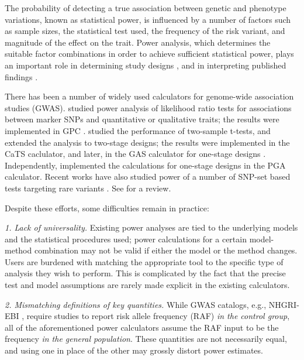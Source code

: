 The probability of detecting a true association between genetic and phenotype variations, known as statistical power, is influenced by a number of factors such as sample sizes, the statistical test used, the frequency of the risk variant, and magnitude of the effect on the trait. 
Power analysis, which determines the suitable factor combinations in order to achieve sufficient statistical power, plays an important role in determining study designs \citep{Skol06, Goodwin16}, and in interpreting published findings \citep{Ioannidis05}.

There has been a number of widely used calculators for genome-wide association studies (GWAS). 
\cite{Sham98} studied power analysis of likelihood ratio tests for associations between marker SNPs and quantitative or qualitative traits; the results were implemented in GPC \citep{Purcell03}.
\cite{Skol06} studied the performance of two-sample t-tests, and extended the analysis to two-stage designs; the results were implemented in the CaTS caclulator, and later, in the GAS calculator for one-stage designs \citep{Johnson17}.
Independently, \citet{Menashe08} implemented the calculations for one-stage designs in the PGA calculator.
Recent works have also studied power of a number of SNP-set based tests targeting rare variants \citep{Wang14, Derkach17}.
See \citet{Sham14} for a review.

Despite these efforts, some difficulties remain in practice:

    {\it 1. Lack of universality.} 
    Existing power analyses are tied to the underlying models and the statistical procedures used; power calculations for a certain model-method combination may not be valid if either the model or the method changes.
    Users are burdened with matching the appropriate tool to the specific type of analysis they wish to perform.
    This is complicated by the fact that the precise test and model assumptions are rarely made explicit in the existing calculators.
    
    {\it 2. Mismatching definitions of key quantities.}
    While GWAS catalogs, e.g., NHGRI-EBI \citep{MacArthur16}, require studies to report risk allele frequency (RAF) \emph{in the control group}, all of the aforementioned power calculators assume the RAF input to be the frequency \emph{in the general population}. 
    These quantities are not necessarily equal, and using one in place of the other may grossly distort power estimates.
    
